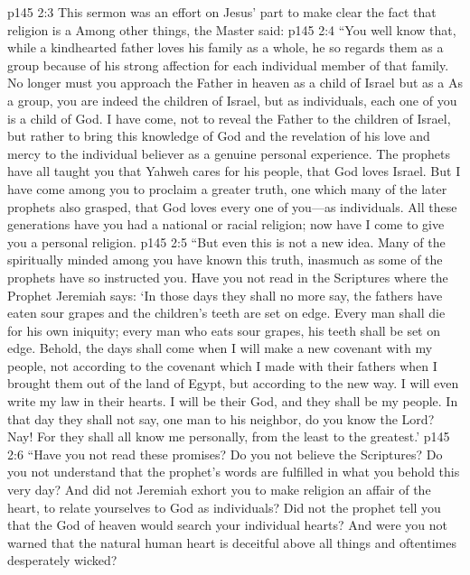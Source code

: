 \vs p145 2:3 This sermon was an effort on Jesus’ part to make clear the fact that religion is a  Among other things, the Master said:
\vs p145 2:4 \textcolor{ubdarkred}{“You well know that, while a kindhearted father loves his family as a whole, he so regards them as a group because of his strong affection for each individual member of that family. No longer must you approach the Father in heaven as a child of Israel but as a  As a group, you are indeed the children of Israel, but as individuals, each one of you is a child of God. I have come, not to reveal the Father to the children of Israel, but rather to bring this knowledge of God and the revelation of his love and mercy to the individual believer as a genuine personal experience. The prophets have all taught you that Yahweh cares for his people, that God loves Israel. But I have come among you to proclaim a greater truth, one which many of the later prophets also grasped, that God loves every one of you---as individuals. All these generations have you had a national or racial religion; now have I come to give you a personal religion.}
\vs p145 2:5 \textcolor{ubdarkred}{“But even this is not a new idea. Many of the spiritually minded among you have known this truth, inasmuch as some of the prophets have so instructed you. Have you not read in the Scriptures where the Prophet Jeremiah says: ‘In those days they shall no more say, the fathers have eaten sour grapes and the children’s teeth are set on edge. Every man shall die for his own iniquity; every man who eats sour grapes, his teeth shall be set on edge. Behold, the days shall come when I will make a new covenant with my people, not according to the covenant which I made with their fathers when I brought them out of the land of Egypt, but according to the new way. I will even write my law in their hearts. I will be their God, and they shall be my people. In that day they shall not say, one man to his neighbor, do you know the Lord? Nay! For they shall all know me personally, from the least to the greatest.’}
\vs p145 2:6 \textcolor{ubdarkred}{“Have you not read these promises? Do you not believe the Scriptures? Do you not understand that the prophet’s words are fulfilled in what you behold this very day? And did not Jeremiah exhort you to make religion an affair of the heart, to relate yourselves to God as individuals? Did not the prophet tell you that the God of heaven would search your individual hearts? And were you not warned that the natural human heart is deceitful above all things and oftentimes desperately wicked?}
